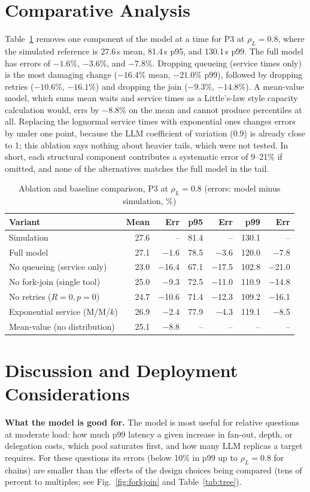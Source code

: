 \documentclass[journal]{IEEEtran}
\begin{document}
\section{Comparative Analysis}\label{sec:compare}
Table~\ref{tab:ablation} removes one component of the model at a time for P3 at $\rho_L=0.8$, where the simulated reference is 27.6\,s mean, 81.4\,s p95, and 130.1\,s p99. The full model has errors of $-1.6\%$, $-3.6\%$, and $-7.8\%$. Dropping queueing (service times only) is the most damaging change ($-16.4\%$ mean, $-21.0\%$ p99), followed by dropping retries ($-10.6\%$, $-16.1\%$) and dropping the join ($-9.3\%$, $-14.8\%$). A mean-value model, which sums mean waits and service times as a Little's-law style capacity calculation would, errs by $-8.8\%$ on the mean and cannot produce percentiles at all. Replacing the lognormal service times with exponential ones changes errors by under one point, because the LLM coefficient of variation (0.9) is already close to 1; this ablation says nothing about heavier tails, which were not tested. In short, each structural component contributes a systematic error of 9--21\% if omitted, and none of the alternatives matches the full model in the tail.
\begin{table}[t]
\caption{Ablation and baseline comparison, P3 at $\rho_L=0.8$ (errors: model minus simulation, \%)}
\label{tab:ablation}
\centering
\scriptsize
\setlength{\tabcolsep}{1.8pt}
\begin{tabular}{lrrrrrr}
\toprule
Variant & Mean & Err & p95 & Err & p99 & Err \\
\midrule
Simulation & 27.6 & -- & 81.4 & -- & 130.1 & -- \\
\midrule
Full model & 27.1 & $-$1.6 & 78.5 & $-$3.6 & 120.0 & $-$7.8 \\
No queueing (service only) & 23.0 & $-$16.4 & 67.1 & $-$17.5 & 102.8 & $-$21.0 \\
No fork-join (single tool) & 25.0 & $-$9.3 & 72.5 & $-$11.0 & 110.9 & $-$14.8 \\
No retries ($R{=}0,p{=}0$) & 24.7 & $-$10.6 & 71.4 & $-$12.3 & 109.2 & $-$16.1 \\
Exponential service (M/M/$k$) & 26.9 & $-$2.4 & 77.9 & $-$4.3 & 119.1 & $-$8.5 \\
Mean-value (no distribution) & 25.1 & $-$8.8 & -- & -- & -- & -- \\
\bottomrule
\end{tabular}
\end{table}

\section{Discussion and Deployment Considerations}\label{sec:discuss}
\textbf{What the model is good for.} The model is most useful for relative questions at moderate load: how much p99 latency a given increase in fan-out, depth, or delegation costs, which pool saturates first, and how many LLM replicas a target requires. For these questions its errors (below 10\% in p99 up to $\rho_L=0.8$ for chains) are smaller than the effects of the design choices being compared (tens of percent to multiples; see Fig.~\ref{fig:forkjoin} and Table~\ref{tab:tree}).
\end{document}
